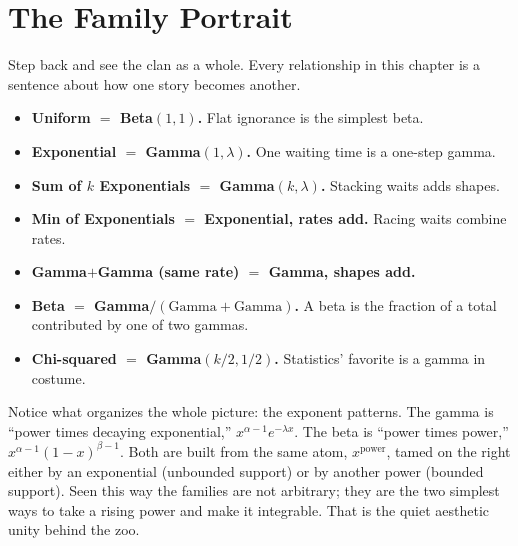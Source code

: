 \section{The Family Portrait}
\label{ch11:portrait}

Step back and see the clan as a whole. Every relationship in this chapter is a
sentence about how one story becomes another.

\begin{itemize}
  \item \textbf{Uniform $=$ Beta$(1,1)$.} Flat ignorance is the simplest beta.
  \item \textbf{Exponential $=$ Gamma$(1,\lambda)$.} One waiting time is a
    one-step gamma.
  \item \textbf{Sum of $k$ Exponentials $=$ Gamma$(k,\lambda)$.} Stacking waits
    adds shapes.
  \item \textbf{Min of Exponentials $=$ Exponential, rates add.} Racing waits
    combine rates.
  \item \textbf{Gamma$+$Gamma (same rate) $=$ Gamma, shapes add.}
  \item \textbf{Beta $=$ Gamma$/(\text{Gamma}+\text{Gamma})$.} A beta is the
    fraction of a total contributed by one of two gammas.
  \item \textbf{Chi-squared $=$ Gamma$(k/2,1/2)$.} Statistics' favorite is a
    gamma in costume.
\end{itemize}

\begin{center}
\end{center}

\begin{aestheticbox}
Notice what organizes the whole picture: the exponent patterns. The gamma is
``power times decaying exponential,'' $x^{\alpha-1}e^{-\lambda x}$. The beta is
``power times power,'' $x^{\alpha-1}(1-x)^{\beta-1}$. Both are built from the
same atom, $x^{\text{power}}$, tamed on the right either by an exponential
(unbounded support) or by another power (bounded support). Seen this way the
families are not arbitrary; they are the two simplest ways to take a rising
power and make it integrable. That is the quiet aesthetic unity behind the zoo.
\end{aestheticbox}


